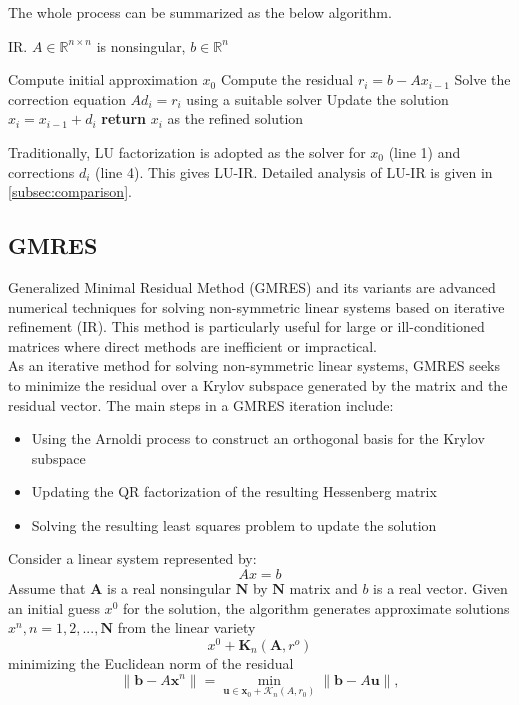 The whole process can be summarized as the below algorithm.
\begin{algorithm}
\caption{IR. $A \in \mathbb{R}^{n \times n}$ is nonsingular, $b \in \mathbb{R}^n$}
\begin{algorithmic}[1]
    \State Compute initial approximation $x_0$
        \State Compute the residual $r_i = b - Ax_{i-1}$
        \State Solve the correction equation $Ad_i = r_i$ using a suitable solver
        \State Update the solution $x_i = x_{i-1} + d_i$
    \EndFor
    \State \textbf{return} $x_i$ as the refined solution
\end{algorithmic}
\end{algorithm}

Traditionally, LU factorization is adopted as the solver for $x_0$ (line 1) and corrections $d_i$ (line 4). This gives LU-IR. Detailed analysis of LU-IR is given in \ref{subsec:comparison}.


\subsection{GMRES}
Generalized Minimal Residual Method (GMRES) and its variants are advanced numerical techniques for solving non-symmetric linear systems based on iterative refinement (IR). This method is particularly useful for large or ill-conditioned matrices where direct methods are inefficient or impractical. \\
As an iterative method for solving non-symmetric linear systems, GMRES seeks to minimize the residual over a Krylov subspace generated by the matrix and the residual vector. The main steps in a GMRES iteration include\cite{Homer1988}:
\begin{itemize}
    \item Using the Arnoldi process to construct an orthogonal basis for the Krylov subspace
    \item Updating the QR factorization of the resulting Hessenberg matrix
    \item Solving the resulting least squares problem to update the solution
\end{itemize}

Consider a linear system represented by:
\begin{equation}
    Ax=b
\end{equation}
Assume that $\textbf{A}$ is a real nonsingular $\textbf{N}$ by $\textbf{N}$ matrix and $b$ is a real vector. Given an initial guess $x^0$ for the solution, the algorithm generates approximate solutions $x^n,n=1,2,...,\textbf{N}$ from the linear variety
\begin{equation}
    x^0+\textbf{K}_n(\textbf{A},r^o)
\end{equation}
minimizing the Euclidean norm of the residual
\begin{equation}
    \| \mathbf{b} - A\mathbf{x}^n \| = \min_{\mathbf{u} \in \mathbf{x}_0 + \mathcal{K}_n(A,r_0)} \| \mathbf{b} - A\mathbf{u} \|,
\end{equation}

